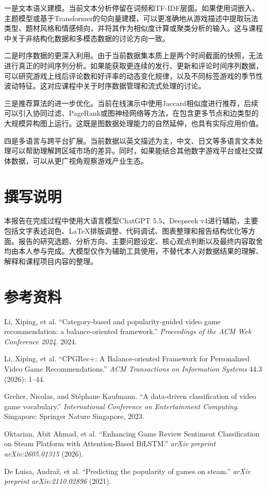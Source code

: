 \documentclass[UTF8,a4paper,12pt,fontset=fandol]{ctexart}
\begin{document}
一是文本语义建模。当前文本分析停留在词频和TF-IDF层面。如果使用词嵌入、主题模型或基于Transformer的句向量建模，可以更准确地从游戏描述中提取玩法类型、题材风格和情感倾向，并将其作为相似度计算或聚类分析的输入。这与课程中关于非结构化数据和多模态数据的讨论方向一致。

二是时序数据的更深入利用。由于当前数据集本质上是两个时间截面的快照，无法进行真正的时间序列分析。如果能获取更连续的发行、更新和评论时间序列数据，可以研究游戏上线后评论数和好评率的动态变化规律，以及不同标签游戏的季节性波动特征。这对应课程中关于时序数据管理和流式处理的讨论。

三是推荐算法的进一步优化。当前在线演示中使用Jaccard相似度进行推荐，后续可以引入协同过滤、PageRank或图神经网络等方法，在包含更多节点和边类型的大规模异构图上运行。这既是图数据处理能力的自然延伸，也具有实际应用价值。

四是多语言与跨平台扩展。当前数据以英文描述为主，中文、日文等多语言文本处理可以帮助理解跨区域市场的差异。同时，如果能结合其他数字游戏平台或社交媒体数据，可以从更广视角观察游戏产业生态。

\section*{撰写说明}

本报告在完成过程中使用大语言模型ChatGPT 5.5、Deepseek v4进行辅助，主要包括文字表述润色、LaTeX排版调整、代码调试、图表整理和报告结构优化等方面。报告的研究选题、分析方向、主要问题设定、核心观点判断以及最终内容取舍均由本人参与完成。大模型仅作为辅助工具使用，不替代本人对数据结果的理解、解释和课程项目内容的整理。

\section*{参考资料}

\begingroup
\raggedright
\begin{enumerate}[label={[\arabic*]},itemsep=0.35em]
  \item Li, Xiping, et al. ``Category-based and popularity-guided video game recommendation: a balance-oriented framework.'' \textit{Proceedings of the ACM Web Conference 2024}. 2024.
  \item Li, Xiping, et al. ``CPGRec+: A Balance-oriented Framework for Personalized Video Game Recommendations.'' \textit{ACM Transactions on Information Systems} 44.3 (2026): 1--44.
  \item Grelier, Nicolas, and Stéphane Kaufmann. ``A data-driven classification of video game vocabulary.'' \textit{International Conference on Entertainment Computing}. Singapore: Springer Nature Singapore, 2023.
  \item Oktarian, Abit Ahmad, et al. ``Enhancing Game Review Sentiment Classification on Steam Platform with Attention-Based BiLSTM.'' \textit{arXiv preprint arXiv:2605.01315} (2026).
  \item De Luisa, Andraž, et al. ``Predicting the popularity of games on steam.'' \textit{arXiv preprint arXiv:2110.02896} (2021).
\end{enumerate}
\par
\endgroup
\end{document}
